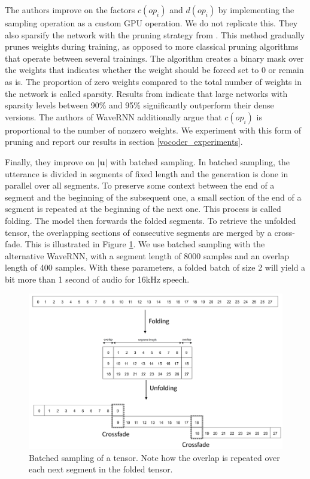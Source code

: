 \documentclass[a4paper, oneside, 12pt, english]{article}
\begin{document}
The authors improve on the factors $c(op_i)$ and $d(op_i)$ by implementing the sampling operation as a custom GPU operation. We do not replicate this. They also sparsify the network with the pruning strategy from \citep{SparsityRNN, 2PruneOrNot2Prune}. This method gradually prunes weights during training, as opposed to more classical pruning algorithms that operate between several trainings. The algorithm creates a binary mask over the weights that indicates whether the weight should be forced set to 0 or remain as is. The proportion of zero weights compared to the total number of weights in the network is called sparsity. Results from \citep{SparsityRNN, 2PruneOrNot2Prune} indicate that large networks with sparsity levels between 90\% and 95\% significantly outperform their dense versions. The authors of WaveRNN additionally argue that $c(op_i)$ is proportional to the number of nonzero weights. We experiment with this form of pruning and report our results in section \ref{vocoder_experiments}.

Finally, they improve on $|\mathbf{u}|$ with batched sampling. In batched sampling, the utterance is divided in segments of fixed length and the generation is done in parallel over all segments. To preserve some context between the end of a segment and the beginning of the subsequent one, a small section of the end of a segment is repeated at the beginning of the next one. This process is called folding. The model then forwards the folded segments. To retrieve the unfolded tensor, the overlapping sections of consecutive segments are merged by a cross-fade. This is illustrated in Figure \ref{batched_sampling}. We use batched sampling with the alternative WaveRNN, with a segment length of 8000 samples and an overlap length of 400 samples. With these parameters, a folded batch of size 2 will yield a bit more than 1 second of audio for 16kHz speech.

\begin{figure}[h]
	\centering
	\includegraphics[width=0.85\linewidth]{images/batched_sampling.png}
	\caption{Batched sampling of a tensor. Note how the overlap is repeated over each next segment in the folded tensor.}
	\label{batched_sampling}
\end{figure}
\end{document}

